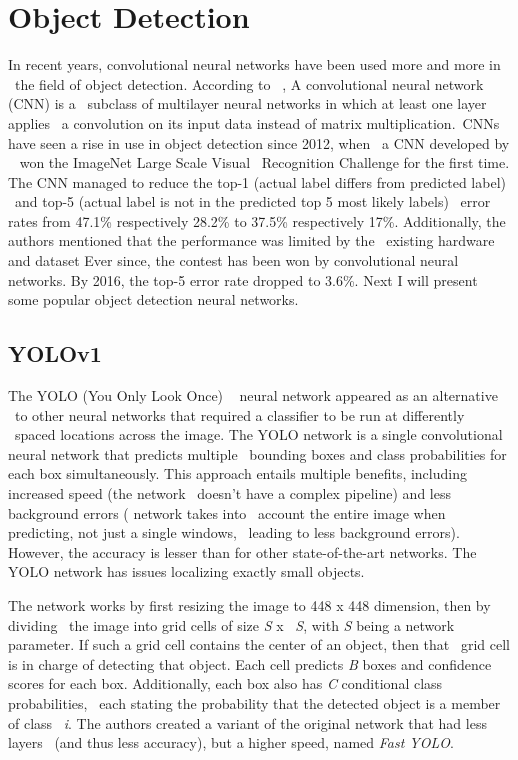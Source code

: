 \section{Object Detection}
\label{sec:research-object-detection}
In recent years, convolutional neural networks have been used more and more in \
the field of object detection.
According to ~\cite{deepLearning}, A convolutional neural network (CNN) is a \
subclass of multilayer neural networks in which at least one layer applies \
a convolution on its input data instead of matrix multiplication.\
CNNs have seen a rise in use in object detection since 2012, when \
a CNN developed by ~\cite{imagenet} won the ImageNet Large Scale Visual \
Recognition Challenge for the first time.
The CNN managed to reduce the top-1 (actual label differs from predicted label) \
 and top-5 (actual label is not in the predicted top 5 most likely labels) \
error rates from 47.1\% respectively 28.2\% to 37.5\% respectively 17\%.
Additionally, the authors mentioned that the performance was limited by the \
existing hardware and dataset
Ever since, the contest has been won by convolutional neural networks.
By 2016, the top-5 error rate dropped to 3.6\%.
Next I will present some popular object detection neural networks.

\subsection{YOLOv1}
\label{subsec:research-yolov1-detectors}
The YOLO (You Only Look Once) ~\cite{yolov1} neural network appeared as an alternative \
to other neural networks that required a classifier to be run at differently \
spaced locations across the image.
The YOLO network is a single convolutional neural network that predicts  multiple \
bounding boxes and class probabilities for each box simultaneously.
This approach entails multiple benefits, including increased speed (the network \
doesn't have a complex pipeline) and less background errors ( network takes into \
account the entire image when predicting, not just a single windows, \
leading to less background errors).
However, the accuracy is lesser than for other state-of-the-art networks.
The YOLO network has issues localizing exactly small objects.

The network works by first resizing the image to 448 x 448 dimension, then by dividing \
the image into grid cells of size \textit{S} x \
\textit{S}, with \textit{S} being a network parameter.
If such a grid cell contains the center of an object, then that \
grid cell is in charge of detecting that object.
Each cell predicts \textit{B} boxes and confidence scores for each box.
Additionally, each box also has \textit{C} conditional class probabilities, \
each stating the probability that the detected object is a member of class \
\textit{i}.
The authors created a variant of the original network that had less layers \
(and thus less accuracy), but a higher speed, named \textit{Fast YOLO}.


